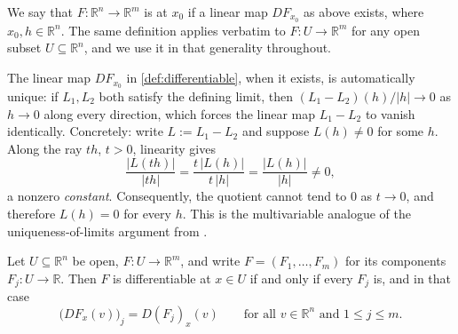 
\begin{definition}[Differentiability]
\label{def:differentiable}
We say that $F : \mathbb{R}^n \to \mathbb{R}^m$ is 
 at $x_0$ if a linear map $DF_{x_0}$ as above exists, where
$x_0, h \in \mathbb{R}^n$. The same definition applies verbatim to $F : U \to \mathbb{R}^m$
for any open subset $U \subseteq \mathbb{R}^n$, and we use it in that generality throughout.
\end{definition}

\begin{remark}
The linear map $DF_{x_0}$ in \cref{def:differentiable}, when it exists, is automatically unique:
if $L_1, L_2$ both satisfy the defining limit, then
$(L_1-L_2)(h)/|h| \to 0$ as $h \to 0$ along every direction, which forces the linear map
$L_1 - L_2$ to vanish identically. Concretely: write $L := L_1-L_2$ and suppose $L(h) \neq 0$
for some $h$. Along the ray $th$, $t > 0$, linearity gives
\[\frac{|L(th)|}{|th|} = \frac{t\,|L(h)|}{t\,|h|} = \frac{|L(h)|}{|h|} \neq 0,\]
a nonzero \emph{constant}. Consequently, the quotient cannot tend to $0$ as $t \to 0$, and
therefore $L(h)=0$ for every $h$. This
is the multivariable analogue of the uniqueness-of-limits argument from
.
\end{remark}

\begin{lemma}
\label{lem:differentiability_componentwise}
Let $U \subseteq \mathbb{R}^n$ be open, $F : U \to \mathbb{R}^m$, and write
$F = (F_1,\dots,F_m)$ for its components $F_j : U \to \mathbb{R}$. Then $F$ is differentiable at
$x \in U$ if and only if every $F_j$ is, and in that case
\[\big(DF_x(v)\big)_j = D(F_j)_x(v) \qquad \text{for all } v \in \mathbb{R}^n \text{ and } 1 \leq j \leq m.\]
\end{lemma}

